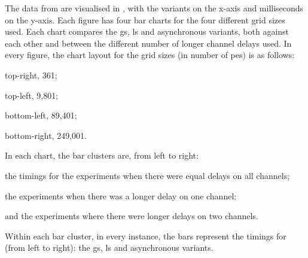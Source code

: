 The data from  are visualised in , with the variants on the x-axis and milliseconds on the y-axis.  Each figure has four bar charts for the four different grid sizes used.  Each chart compares the \gls{gs}, \gls{ls} and asynchronous variants, both against each other and between the different number of longer channel delays used.  In every figure, the chart layout for the grid sizes (in number of \glspl{pe}) is as follows:
\begin{inparablank}
\item top-right, 361;
\item top-left, 9,801;
\item bottom-left, 89,401;
\item bottom-right, 249,001.
\end{inparablank}
In each chart, the bar clusters are, from left to right:
\begin{inparaenum}[a)]
\item the timings for the experiments when there were equal delays on all channels;
\item the experiments when there was a longer delay on one channel;
\item and the experiments where there were longer delays on two channels.
\end{inparaenum}
Within each bar cluster, in every instance, the bars represent the timings for (from left to right):  the \gls{gs}, \gls{ls} and asynchronous variants.

